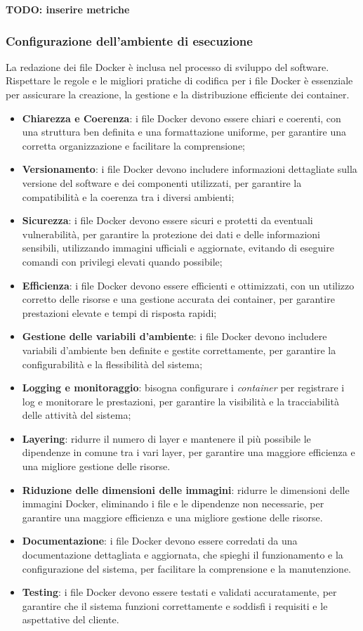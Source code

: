 \textbf{TODO: inserire metriche}

\subsubsection{Configurazione dell'ambiente di esecuzione}
La redazione dei file Docker è inclusa nel processo di sviluppo del software. Rispettare le regole e le migliori pratiche di codifica per i file Docker è essenziale per assicurare la creazione, la gestione e la distribuzione efficiente dei container.\\
\begin{itemize}
	\item \textbf{Chiarezza e Coerenza}: i file Docker devono essere chiari e coerenti, con una struttura ben definita e una formattazione uniforme, per garantire una corretta organizzazione e facilitare la comprensione;
	\item \textbf{Versionamento}: i file Docker devono includere informazioni dettagliate sulla versione del software e dei componenti utilizzati, per garantire la compatibilità e la coerenza tra i diversi ambienti;
	\item \textbf{Sicurezza}: i file Docker devono essere sicuri e protetti da eventuali vulnerabilità, per garantire la protezione dei dati e delle informazioni sensibili, utilizzando immagini ufficiali e aggiornate, evitando di eseguire comandi con privilegi elevati quando possibile;
	\item \textbf{Efficienza}: i file Docker devono essere efficienti e ottimizzati, con un utilizzo corretto delle risorse e una gestione accurata dei container, per garantire prestazioni elevate e tempi di risposta rapidi;
	\item \textbf{Gestione delle variabili d'ambiente}: i file Docker devono includere variabili d'ambiente ben definite e gestite correttamente, per garantire la configurabilità e la flessibilità del sistema;
	\item \textbf{Logging e monitoraggio}: bisogna configurare i \textit{container} per registrare i log e monitorare le prestazioni, per garantire la visibilità e la tracciabilità delle attività del sistema;
	\item \textbf{Layering}: ridurre il numero di layer e mantenere il più possibile le dipendenze in comune tra i vari layer, per garantire una maggiore efficienza e una migliore gestione delle risorse.
	\item \textbf{Riduzione delle dimensioni delle immagini}: ridurre le dimensioni delle immagini Docker, eliminando i file e le dipendenze non necessarie, per garantire una maggiore efficienza e una migliore gestione delle risorse.
	\item \textbf{Documentazione}: i file Docker devono essere corredati da una documentazione dettagliata e aggiornata, che spieghi il funzionamento e la configurazione del sistema, per facilitare la comprensione e la manutenzione.
	\item \textbf{Testing}: i file Docker devono essere testati e validati accuratamente, per garantire che il sistema funzioni correttamente e soddisfi i requisiti e le aspettative del cliente.
\end{itemize}

